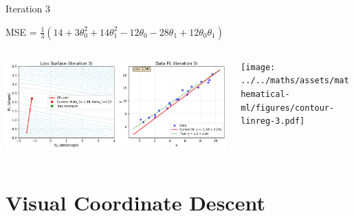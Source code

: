 \documentclass{beamer}
\begin{document}
\begin{frame}{Iteration 3}

MSE = $\frac{1}{3}(14+3\theta_{0}^{2}+14\theta_{1}^{2}-12\theta_{0}-28\theta_{1}+12\theta_{0}\theta_{1})$\\

\begin{columns}
\begin{column}{0.6\textwidth}
\begin{adjustbox}{max totalsize={\textwidth},center}
\includegraphics[width=\textwidth]{../../maths/assets/mathematical-ml/figures/gradient-descent-3.pdf}
\end{adjustbox}

\end{column}
\begin{column}{0.5\textwidth}
\begin{adjustbox}{max totalsize={\textwidth},center}
\texttt{[image: ../../maths/assets/mathematical-ml/figures/contour-linreg-3.pdf]}
\end{adjustbox}
\end{column}
\end{columns}


\end{frame}


\section{Visual Coordinate Descent}
\end{document}

